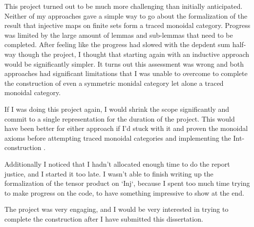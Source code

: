 This project turned out to be much more challenging than initially
anticipated. Neither of my approaches gave a simple way to go about
the formalization of the result that injective maps on finite sets
form a traced monoidal category. Progress was limited by the large
amount of lemmas and sub-lemmas that need to be completed. After
feeling like the progress had slowed with the depdent sum half-way
though the project, I thought that starting again with an inductive
approach would be significantly simpler. It turns out this assessment
was wrong and both approaches had significant limitations that I was
unable to overcome to complete the construction of even a symmetric
monidal category let alone a traced monoidal category.

If I was doing this project again, I would shrink the scope
significantly and commit to a single representation for the duration
of the project. This would have been better for either approach if I'd
stuck with it and proven the monoidal axioms before attempting traced
monoidal categories and implementing the \textrm{Int}-construction
\cite{joyal1996-traced-monoidal-categories}.

Additionally I noticed that I hadn't allocated enough time to do the
report justice, and I started it too late. I wasn't able to finish
writing up the formalization of the tensor product on `Inj`, because I
spent too much time trying to make progress on the code, to have
something impressive to show at the end.

The project was very engaging, and I would be very interested in
trying to complete the construction after I have submitted this
dissertation.
